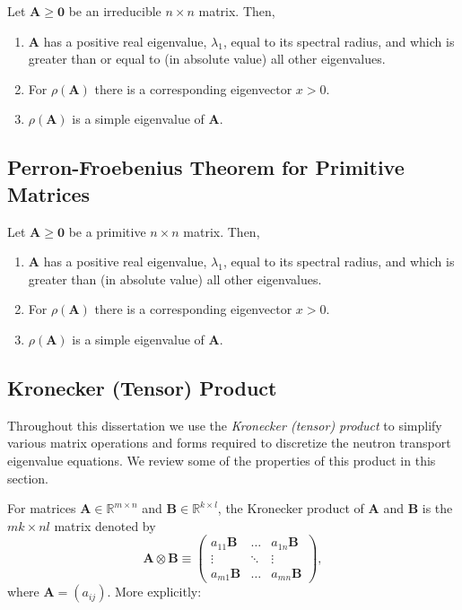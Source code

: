 \begin{theorem}
Let $\mathbf{A} \ge \mathbf{0}$ be an irreducible $n \times n$ matrix. Then,
	\begin{enumerate}
		\item $\mathbf{A}$ has a positive real eigenvalue, $\lambda_{1}$, equal to its spectral radius, and which is greater than or equal to (in absolute value) all other eigenvalues.
		\item For $\rho(\mathbf{A})$ there is a corresponding eigenvector $x > 0$.
		\item $\rho(\mathbf{A})$ is a simple eigenvalue of $\mathbf{A}$.
	\end{enumerate}
\end{theorem}

\subsection{Perron-Froebenius Theorem for Primitive Matrices}

\begin{theorem}
Let $\mathbf{A} \ge \mathbf{0}$ be a primitive $n \times n$ matrix. Then,
	\begin{enumerate}
		\item $\mathbf{A}$ has a positive real eigenvalue, $\lambda_{1}$, equal to its spectral radius, and which is greater than (in absolute value) all other eigenvalues.
		\item For $\rho(\mathbf{A})$ there is a corresponding eigenvector $x > 0$.
		\item $\rho(\mathbf{A})$ is a simple eigenvalue of $\mathbf{A}$.
	\end{enumerate}
\end{theorem}

\subsection{Kronecker (Tensor) Product}

Throughout this dissertation we use the \textit{Kronecker (tensor) product} to simplify various matrix operations and forms required to discretize the neutron transport eigenvalue equations. We review some of the properties \cite{horn_topics_1994} of this product in this section. 

For matrices $\mathbf{A} \in \mathbb{R}^{m \times n}$ and $\mathbf{B} \in \mathbb{R}^{k \times l}$, the Kronecker product of $\mathbf{A}$ and $\mathbf{B}$ is the $mk \times nl$ matrix denoted by
\begin{equation}
	\mathbf{A} \otimes \mathbf{B} \equiv \begin{pmatrix}
					a_{11}\mathbf{B} & \dots & a_{1n}\mathbf{B} \\
					\vdots & \ddots & \vdots \\
					a_{m1}\mathbf{B} & \dots & a_{mn}\mathbf{B}
				    \end{pmatrix},
\end{equation}
where $\mathbf{A} = (a_{ij})$. More explicitly:

